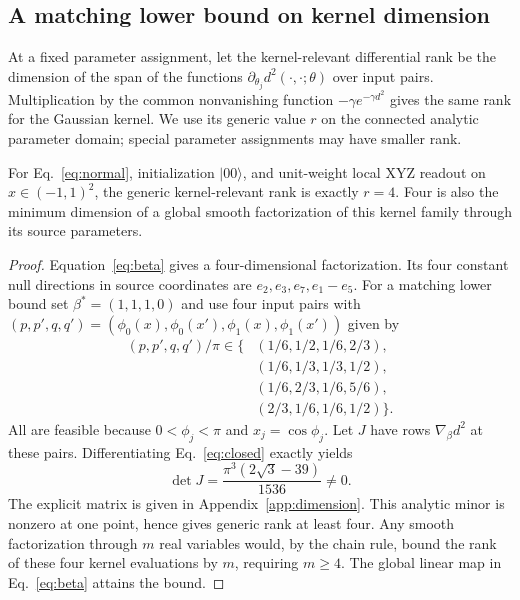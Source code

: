 \subsection{A matching lower bound on kernel dimension}
\label{sec:dimensiontheory}
At a fixed parameter assignment, let the kernel-relevant differential
rank be the dimension of the span of the functions
$\partial_{\theta_j}d^2(\cdot,\cdot;\theta)$ over input pairs.
Multiplication by the common nonvanishing function
$-\gamma e^{-\gamma d^2}$ gives the same rank for the Gaussian kernel.
We use its generic value $r$ on the connected analytic parameter domain;
special parameter assignments may have smaller rank.

\begin{proposition}
For Eq.~\eqref{eq:normal}, initialization $|00\rangle$, and unit-weight
local XYZ readout on $x\in(-1,1)^2$, the generic kernel-relevant rank is
exactly $r=4$. Four is also the minimum dimension of a global smooth
factorization of this kernel family through its source parameters.
\end{proposition}
\begin{proof}
Equation~\eqref{eq:beta} gives a four-dimensional factorization. Its
four constant null directions in source coordinates are
$e_2,e_3,e_7,e_1-e_5$. For a matching lower bound set
$\beta^*=(1,1,1,0)$ and use four input pairs with
$(p,p',q,q')=(\phi_0(x),\phi_0(x'),\phi_1(x),\phi_1(x'))$ given by
\begin{align}
 (p,p',q,q')/\pi\in\{& (1/6,1/2,1/6,2/3),\nonumber\\
 &(1/6,1/3,1/3,1/2),\nonumber\\
 &(1/6,2/3,1/6,5/6),\nonumber\\
 &(2/3,1/6,1/6,1/2)\}.
 \label{eq:rankpoints}
\end{align}
All are feasible because $0<\phi_j<\pi$ and $x_j=\cos\phi_j$.
Let $J$ have rows $\nabla_\beta d^2$ at these pairs. Differentiating
Eq.~\eqref{eq:closed} exactly yields
\begin{equation}
 \det J=\frac{\pi^3(2\sqrt3-39)}{1536}\ne0.
 \label{eq:rankminor}
\end{equation}
The explicit matrix is given in Appendix~\ref{app:dimension}.
This analytic minor is nonzero at one point, hence gives generic rank
at least four. Any smooth factorization through $m$ real variables
would, by the chain rule, bound the rank of these four kernel evaluations
by $m$, requiring $m\ge4$. The global linear map in
Eq.~\eqref{eq:beta} attains the bound.
\end{proof}

